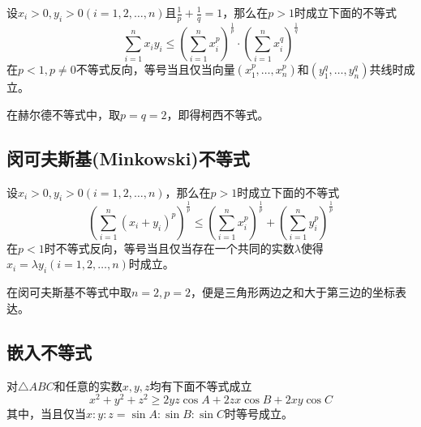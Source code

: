 \begin{theorem}[赫尔德不等式]
  设$x_i> 0, y_i> 0 (i=1,2,\ldots,n)$且$\frac{1}{p}+\frac{1}{q}=1$，那么在$p>1$时成立下面的不等式
  \begin{equation}
    \label{eq:holder-inequation}
    \sum_{i=1}^nx_iy_i \leqslant \left( \sum_{i=1}^nx_i^p \right)^{\frac{1}{p}} \cdot \left( \sum_{i=1}^nx_i^q \right)^{\frac{1}{q}}
  \end{equation}
  在$p<1,p\neq 0$不等式反向，等号当且仅当向量$(x_1^p,\ldots,x_n^p)$和$(y_1^q,\ldots,y_n^q)$共线时成立。
\end{theorem}
在赫尔德不等式中，取$p=q=2$，即得柯西不等式。

\subsection{闵可夫斯基(Minkowski)不等式}


\begin{theorem}[闵可夫斯基不等式]
  设$x_i>0, y_i>0 (i=1,2,\ldots,n)$，那么在$p>1$时成立下面的不等式
  \begin{equation}
    \label{eq:holder-inequation}
    \left( \sum_{i=1}^n(x_i+y_i)^p \right)^{\frac{1}{p}} \leqslant \left( \sum_{i=1}^nx_i^p \right)^{\frac{1}{p}} + \left( \sum_{i=1}^ny_i^p \right)^{\frac{1}{p}}
  \end{equation}
  在$p<1$时不等式反向，等号当且仅当存在一个共同的实数$\lambda$使得$x_i=\lambda y_i(i=1,2,\ldots,n)$时成立。
\end{theorem}
在闵可夫斯基不等式中取$n=2,p=2$，便是三角形两边之和大于第三边的坐标表达。

\subsection{嵌入不等式}

\begin{theorem}[嵌入不等式]
  对$\triangle ABC$和任意的实数$x,y,z$均有下面不等式成立
  \begin{equation}
    \label{eq:embedding-inequation}
    x^2+y^2+z^2 \geqslant 2yz\cos{A}+2zx\cos{B}+2xy\cos{C}
  \end{equation}
  其中，当且仅当$x:y:z = \sin{A} : \sin{B} : \sin{C}$时等号成立。
\end{theorem}

